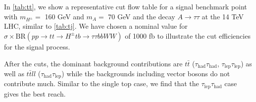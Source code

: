 In \autoref{tab:tt}, we show a representative cut flow table for a signal benchmark point with $m_{H^{\pm}}=$ 160 GeV and $m_A=$ 70 GeV and the decay $A\rightarrow\tau\tau$ at the 14 TeV LHC, similar to \autoref{tab:tj}. We have chosen a nominal value for $\sigma \times \text{BR}(pp \rightarrow tt \rightarrow H^{\pm} tb \rightarrow \tau\tau bb WW)$ of 1000 fb to illustrate the cut efficiencies for the signal process. 

After the cuts, the dominant background contributions are $t\bar{t}$ ($\tau_\text{had}\tau_\text{had}$, $\tau_\text{lep}\tau_\text{lep}$) as well as $t\bar{t}ll$ ($\tau_\text{had}\tau_\text{lep}$) while the backgrounds including vector bosons do not contribute much. Similar to the single top case, we find that the $\tau_\text{lep}\tau_\text{had}$ case gives the best reach.

